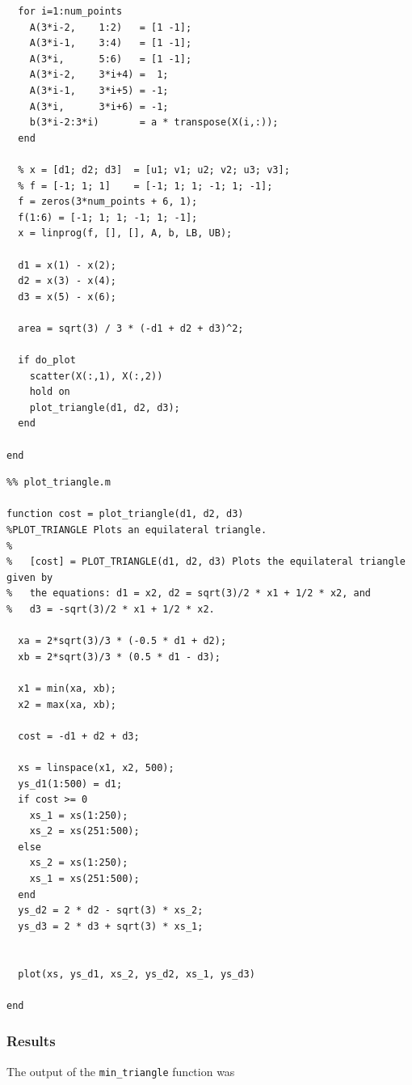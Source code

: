 \documentclass{article}
\begin{document}
\begin{lstlisting}
  for i=1:num_points
    A(3*i-2,    1:2)   = [1 -1];
    A(3*i-1,    3:4)   = [1 -1];
    A(3*i,      5:6)   = [1 -1];
    A(3*i-2,    3*i+4) =  1;
    A(3*i-1,    3*i+5) = -1;
    A(3*i,      3*i+6) = -1;
    b(3*i-2:3*i)       = a * transpose(X(i,:));
  end
  
  % x = [d1; d2; d3]  = [u1; v1; u2; v2; u3; v3];
  % f = [-1; 1; 1]    = [-1; 1; 1; -1; 1; -1];
  f = zeros(3*num_points + 6, 1);
  f(1:6) = [-1; 1; 1; -1; 1; -1];
  x = linprog(f, [], [], A, b, LB, UB);
  
  d1 = x(1) - x(2);
  d2 = x(3) - x(4);
  d3 = x(5) - x(6);
  
  area = sqrt(3) / 3 * (-d1 + d2 + d3)^2;
  
  if do_plot
    scatter(X(:,1), X(:,2))
    hold on
    plot_triangle(d1, d2, d3);
  end

end
\end{lstlisting}

\newpage

\begin{lstlisting}
%% plot_triangle.m

function cost = plot_triangle(d1, d2, d3)
%PLOT_TRIANGLE Plots an equilateral triangle.
%
%   [cost] = PLOT_TRIANGLE(d1, d2, d3) Plots the equilateral triangle given by
%   the equations: d1 = x2, d2 = sqrt(3)/2 * x1 + 1/2 * x2, and
%   d3 = -sqrt(3)/2 * x1 + 1/2 * x2.
  
  xa = 2*sqrt(3)/3 * (-0.5 * d1 + d2);
  xb = 2*sqrt(3)/3 * (0.5 * d1 - d3);
  
  x1 = min(xa, xb);
  x2 = max(xa, xb);
  
  cost = -d1 + d2 + d3;
  
  xs = linspace(x1, x2, 500);
  ys_d1(1:500) = d1;
  if cost >= 0
    xs_1 = xs(1:250);
    xs_2 = xs(251:500);
  else
    xs_2 = xs(1:250);
    xs_1 = xs(251:500);
  end
  ys_d2 = 2 * d2 - sqrt(3) * xs_2;
  ys_d3 = 2 * d3 + sqrt(3) * xs_1;
  
  
  plot(xs, ys_d1, xs_2, ys_d2, xs_1, ys_d3)

end
\end{lstlisting}

\subsubsection{Results}

The output of the \texttt{min\_triangle} function was
\end{document}
